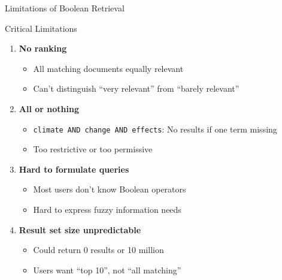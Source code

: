 \documentclass[aspectratio=169]{beamer}
\newif\ifanimated
\newcommand{\cpause}{\ifanimated\pause\fi}
\begin{document}
\begin{frame}{Limitations of Boolean Retrieval}
\begin{alertblock}{ Critical Limitations}
\begin{enumerate}
    \item[\ding{55}] \textbf{No ranking}
    \begin{itemize}
        \item All matching documents equally relevant
        \item Can't distinguish ``very relevant'' from ``barely relevant''
    \end{itemize}
\cpause
    \item[\ding{55}] \textbf{All or nothing}
    \begin{itemize}
        \item \texttt{climate AND change AND effects}: No results if one term missing
        \item Too restrictive or too permissive
    \end{itemize}
\cpause
    \item[\ding{55}] \textbf{Hard to formulate queries}
    \begin{itemize}
        \item Most users don't know Boolean operators
        \item Hard to express fuzzy information needs
    \end{itemize}
\cpause
    \item[\ding{55}] \textbf{Result set size unpredictable}
    \begin{itemize}
        \item Could return 0 results or 10 million
        \item Users want ``top 10'', not ``all matching''
    \end{itemize}
\end{enumerate}
\end{alertblock}
\end{frame}
\end{document}
